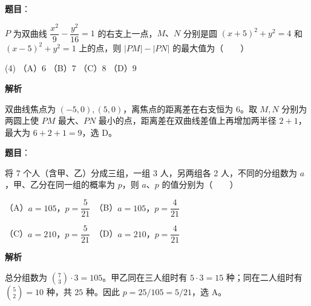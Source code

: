 \begin{answer}

\textbf{题目}：

$P$ 为双曲线 $\dfrac{x^2}{9}-\dfrac{y^2}{16}=1$ 的右支上一点，$M\text{、}N$ 分别是圆 $(x+5)^2+y^2=4$ 和 $(x-5)^2+y^2=1$ 上的点，则 $|PM|-|PN|$ 的最大值为\mbox{（　　）}

\begin{gkopts}(4)
\task （A）$6$
\task （B）$7$
\task （C）$8$
\task （D）$9$
\end{gkopts}

\textbf{解析}

双曲线焦点为 $(-5,0),(5,0)$，离焦点的距离差在右支恒为 $6$。取 $M,N$ 分别为两圆上使 $PM$ 最大、$PN$ 最小的点，距离差在双曲线差值上再增加两半径 $2+1$，最大为 $6+2+1=9$，选 D。


\end{answer}
\begin{answer}

\textbf{题目}：

将 7 个人（含甲、乙）分成三组，一组 3 人，另两组各 2 人，不同的分组数为 $a$，甲、乙分在同一组的概率为 $p$，则 $a\text{、}p$ 的值分别为\mbox{（　　）}

（A）$a=105\text{，}p=\dfrac5{21}$　（B）$a=105\text{，}p=\dfrac4{21}$

（C）$a=210\text{，}p=\dfrac5{21}$　（D）$a=210\text{，}p=\dfrac4{21}$

\textbf{解析}

总分组数为 $\binom73\cdot3=105$。甲乙同在三人组时有 $5\cdot3=15$ 种；同在二人组时有 $\binom52=10$ 种，共 $25$ 种。因此 $p=25/105=5/21$，选 A。


\end{answer}
